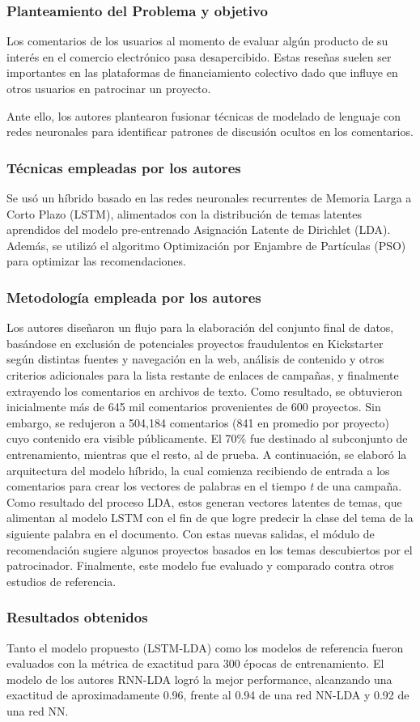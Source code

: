 \subsubsection{Planteamiento del Problema y objetivo}
Los comentarios de los usuarios al momento de evaluar algún producto de su interés en el comercio electrónico pasa desapercibido. Estas reseñas suelen ser importantes en las plataformas de financiamiento colectivo dado que influye en otros usuarios en patrocinar un proyecto.

Ante ello, los autores plantearon fusionar técnicas de modelado de lenguaje con redes neuronales para identificar patrones de discusión ocultos en los comentarios.

\subsubsection{Técnicas empleadas por los autores}
Se usó un híbrido basado en las redes neuronales recurrentes de Memoria Larga a Corto Plazo (LSTM), alimentados con la distribución de temas latentes aprendidos del modelo pre-entrenado Asignación Latente de Dirichlet (LDA). Además, se utilizó el algoritmo Optimización por Enjambre de Partículas (PSO) para optimizar las recomendaciones.

\subsubsection{Metodología empleada por los autores}
Los autores diseñaron un flujo para la elaboración del conjunto final de datos, basándose en exclusión de potenciales proyectos fraudulentos en Kickstarter según distintas fuentes y navegación en la web, análisis de contenido y otros criterios adicionales para la lista restante de enlaces de campañas, y finalmente extrayendo los comentarios en archivos de texto. Como resultado, se obtuvieron inicialmente más de 645 mil comentarios provenientes de 600 proyectos. Sin embargo, se redujeron a 504,184 comentarios (841 en promedio por proyecto) cuyo contenido era visible públicamente. El 70\% fue destinado al subconjunto de entrenamiento, mientras que el resto, al de prueba. A continuación, se elaboró la arquitectura del modelo híbrido, la cual comienza recibiendo de entrada a los comentarios para crear los vectores de palabras en el tiempo \textit{t} de una campaña. Como resultado del proceso LDA, estos generan vectores latentes de temas, que alimentan al modelo LSTM con el fin de que logre predecir la clase del tema de la siguiente palabra en el documento. Con estas nuevas salidas, el módulo de recomendación sugiere algunos proyectos basados en los temas descubiertos por el patrocinador. Finalmente, este modelo fue evaluado y comparado contra otros estudios de referencia.

\subsubsection{Resultados obtenidos}
Tanto el modelo propuesto (LSTM-LDA) como los modelos de referencia fueron evaluados con la métrica de exactitud para 300 épocas de entrenamiento. El modelo de los autores RNN-LDA logró la mejor performance, alcanzando una exactitud de aproximadamente 0.96, frente al 0.94 de una red NN-LDA y 0.92 de una red NN.